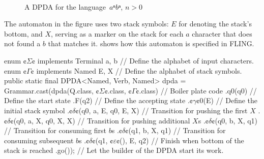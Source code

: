 \documentclass[a4paper,UKenglish,cleveref, autoref]{darts-v2019}
\begin{document}
\begin{scope}
\begin{enumerate}
\begin{figure}
    \caption{A DPDA for the language~$aⁿbⁿ$, $n>0$}
    \label{figure:anbn} 
    \centering
﻿


%
\end{figure}
The automaton in the figure uses two stack symbols: $E$ for denoting the
stack's bottom, and $X$, serving as a marker on the stack for 
each $a$ character that does not found a $b$ that matches it.
 shows how this automaton is specified in FLING.

\begin{excerpt}[language=java,label={lst:anbn},caption={%
    Fling specification, in a fluent API fashion, of the DPDA of \cref{figure:anbn}.}
]
enum ¢$Σ$¢ implements Terminal {a, b } // Define the alphabet of input characters. 
enum ¢$Γ$¢ implements Named { E, X }// Define the alphabet of stack symbols. 
public static final DPDA<Named, Verb, Named> dpda = 
  Grammar.cast(dpda(Q.class, ¢$Σ$¢.class, ¢$Γ$¢.class) // Boiler plate code
    .q0(q0) // Define the start state
    .F(q2)  // Define the accepting state
    .¢$γ$¢0(E)  //  Define the initial stack symbol
    .¢$δ$¢(q0, a, E, q0, E, X) // Transition for pushing the first $X$
    .¢$δ$¢(q0, a, X, q0, X, X) // Transition for pushing additional $X$s
    .¢$δ$¢(q0, b, X, q1) // Transition for consuming first $b$s
    .¢$δ$¢(q1, b, X, q1) // Transition for consuming subsequent $b$s
    .¢$δ$¢(q1, ¢$ε$¢(), E, q2) // Finish when bottom of the stack is reached
    .go()); // Let the builder of the DPDA start its work. 
\end{excerpt}


\end{enumerate}
\end{scope}
\end{document}
